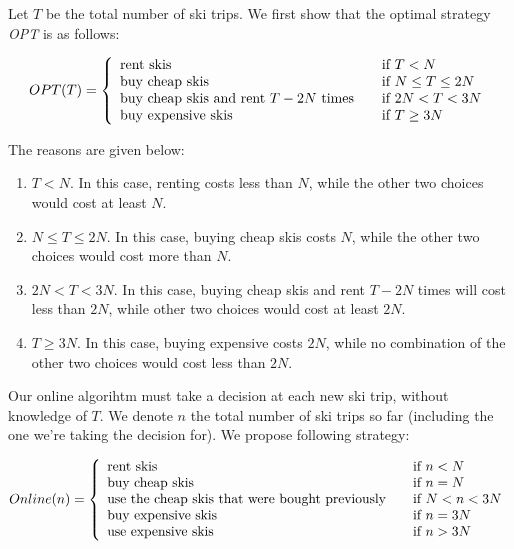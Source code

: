 Let $T$ be the total number of ski trips. We first show that the optimal strategy \textit{OPT} is as follows:

\[ OPT(T) = \left\{
  \begin{array}{l l}
    \text{rent skis} & \quad \text{if $T < N$}  \\
    \text{buy cheap skis} & \quad \text{if $N \leq T \leq 2N$} \\
    \text{buy cheap skis and rent $T - 2N$ times} & \quad \text{if $2N < T < 3N$} \\
    \text{buy expensive skis} & \quad \text{if $T \geq 3N$}\\
  \end{array} \right.
\]

\noindent
The reasons are given below:

\begin{enumerate}
  \item \textbf{$T < N$}. In this case, renting costs less than $N$, while the other two choices would cost at least $N$.
  \item \textbf{$N \leq T \leq 2N$}. In this case, buying cheap skis costs $N$, while the other two choices would cost more than $N$.
  \item \textbf{$2N < T < 3N$}. In this case, buying cheap skis and rent $T-2N$ times will cost less than $2N$, while other two choices would cost at least $2N$.
  \item \textbf{$T \geq 3N$}. In this case, buying expensive costs $2N$, while no combination of the other two choices would cost less than $2N$.
\end{enumerate}

\noindent
Our online algorihtm must take a decision at each new ski trip, without knowledge of $T$. We denote $n$ the total number of ski trips so far (including the one we're taking the decision for). We propose following strategy:

\[Online(n) = \left\{
  \begin{array}{l l}
    \text{rent skis} & \quad \text{if $n < N$}  \\
    \text{buy cheap skis} & \quad \text{if $n = N$}  \\
    \text{use the cheap skis that were bought previously} & \quad \text{if $N < n < 3N$} \\
    \text{buy expensive skis} & \quad \text{if $n = 3N$} \\
    \text{use expensive skis} & \quad \text{if $n > 3N$}\\
  \end{array} \right.
\]

